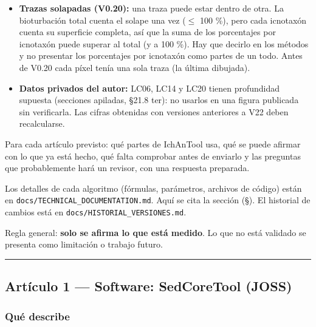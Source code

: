 \documentclass[
  10pt,
]{article}
\begin{document}
\begin{itemize}
  evaluación es optimista: elegir el ajuste con unas secciones y evaluar
  con otras. Sin trazas identificadas (V0.37) la puntuación es el
  cociente de Fisher en el umbral de Otsu multiplicado por la coherencia
  espacial κ de la separación, de modo que el ruido sin estructura
  puntúa $\approx$ 0 con cualquier realce; no es un método publicado y se
  presenta como propuesta inicial.
\item
  \textbf{Trazas solapadas (V0.20):} una traza puede estar dentro de
  otra. La bioturbación total cuenta el solape una vez ($\leq$ 100 \%), pero
  cada icnotaxón cuenta su superficie completa, así que la suma de los
  porcentajes por icnotaxón puede superar al total (y a 100 \%). Hay que
  decirlo en los métodos y no presentar los porcentajes por icnotaxón
  como partes de un todo. Antes de V0.20 cada píxel tenía una sola traza
  (la última dibujada).
\item
  \textbf{Datos privados del autor:} LC06, LC14 y LC20 tienen
  profundidad supuesta (secciones apiladas, §21.8 ter): no usarlos en
  una figura publicada sin verificarla. Las cifras obtenidas con
  versiones anteriores a V22 deben recalcularse.
\end{itemize}

Para cada artículo previsto: qué partes de IchAnTool usa, qué se puede
afirmar con lo que ya está hecho, qué falta comprobar antes de enviarlo
y las preguntas que probablemente hará un revisor, con una respuesta
preparada.

Los detalles de cada algoritmo (fórmulas, parámetros, archivos de
código) están en \texttt{docs/TECHNICAL\_DOCUMENTATION.md}. Aquí se cita
la sección (§). El historial de cambios está en
\texttt{docs/HISTORIAL\_VERSIONES.md}.

Regla general: \textbf{solo se afirma lo que está medido}. Lo que no
está validado se presenta como limitación o trabajo futuro.

\begin{center}\rule{0.5\linewidth}{0.5pt}\end{center}

\hypertarget{artuxedculo-1-software-sedcoretool-joss}{%
\subsection{Artículo 1 --- Software: SedCoreTool
(JOSS)}\label{artuxedculo-1-software-sedcoretool-joss}}

\hypertarget{quuxe9-describe}{%
\subsubsection{Qué describe}\label{quuxe9-describe}}
\end{document}
